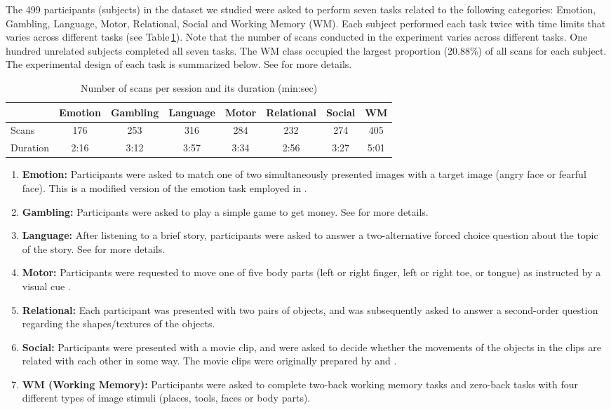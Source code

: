 The 499 participants (subjects) in the dataset we studied were asked to perform seven tasks related to the following categories: Emotion, Gambling, Language, Motor, Relational, Social and Working Memory (WM).
%
Each subject performed each task twice with time limits that varies across different tasks (see Table\,\ref{tab:1}).
%
Note that the number of scans conducted in the experiment varies across different tasks.
%
One hundred unrelated subjects completed all seven tasks.
%
The WM class occupied the largest proportion ($20.88$\%) of all scans for each subject.
%
The experimental design of each task is summarized below.
%
See \cite{barch2013function} for more details.
%
\begin{table}[htbp]
 \centering
  \caption{Number of scans per session and its duration (min:sec)}
 {\small
  \begin{tabular}{lccccccc}
   \hline
    & \textbf{Emotion} & \textbf{Gambling} & \textbf{Language} & \textbf{Motor} & \textbf{Relational} & \textbf{Social} & \textbf{WM}\\
   \hline
   Scans & 176 & 253 & 316 & 284 & 232 & 274 & 405  \\
   Duration & 2:16 & 3:12 & 3:57 & 3:34 & 2:56 & 3:27 & 5:01   \\
   \hline
  \end{tabular}
  \label{tab:1}
 }
\end{table}
%
\begin{enumerate}
 \item \textbf{Emotion:} Participants were asked to match one of two simultaneously presented images with a target image (angry face or fearful face). This is a modified version of the emotion task employed in \cite{hariri2002amygdala}.
 \item \textbf{Gambling:} Participants were asked to play a simple game to get money. See \cite{delgado2000tracking} for more details.
 \item \textbf{Language:} After listening to a brief story, participants were asked to answer a two-alternative forced choice question about the topic of the story. See \cite{binder2011mapping} for more details.
 \item \textbf{Motor:} Participants were requested to move one of five body parts (left or right finger, left or right toe, or tongue) as instructed by a visual cue \cite{buckner2011organization}.
 \item \textbf{Relational:} Each participant was presented with two pairs of objects, and was subsequently asked to answer a second-order question regarding the shapes/textures of the objects.
 \item \textbf{Social:} Participants were presented with a movie clip, and were asked to decide whether the movements of the objects in the clips are related with each other in some way. The movie clips were originally prepared by \cite{castelli2000movement} and \cite{wheatley2007understanding}.
 \item \textbf{WM (Working Memory):} Participants were asked to complete two-back working memory tasks and zero-back tasks with four different types of image stimuli (places, tools, faces or body parts).
\end{enumerate}
